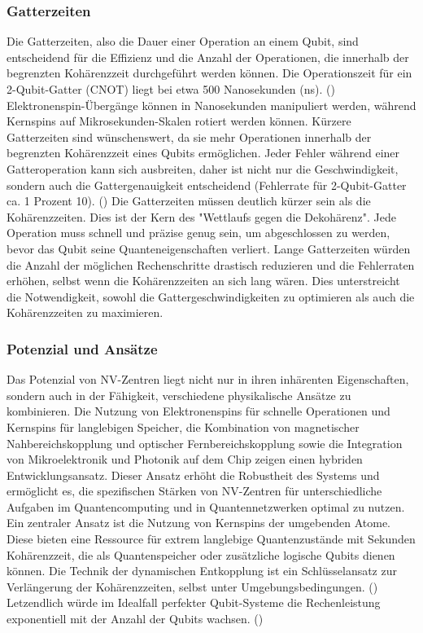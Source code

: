 \subsubsection{Gatterzeiten}
Die Gatterzeiten, also die Dauer einer Operation an einem Qubit, sind entscheidend für die Effizienz und die Anzahl der Operationen, die innerhalb der begrenzten Kohärenzzeit durchgeführt werden können.
Die Operationszeit für ein 2-Qubit-Gatter (CNOT) liegt bei etwa 500 Nanosekunden (ns). (\cite{UngeahnteMoglichkeitenDurch}) Elektronenspin-Übergänge können in Nanosekunden manipuliert werden, während Kernspins auf Mikrosekunden-Skalen rotiert werden können. Kürzere Gatterzeiten sind wünschenswert, da sie mehr Operationen innerhalb der begrenzten Kohärenzzeit eines Qubits ermöglichen. Jeder Fehler während einer Gatteroperation kann sich ausbreiten, daher ist nicht nur die Geschwindigkeit, sondern auch die Gattergenauigkeit entscheidend (Fehlerrate für 2-Qubit-Gatter ca. 1 Prozent 10). (\cite{childressDiamondNVCenters2013})
Die Gatterzeiten müssen deutlich kürzer sein als die Kohärenzzeiten. Dies ist der Kern des "Wettlaufs gegen die Dekohärenz". Jede Operation muss schnell und präzise genug sein, um abgeschlossen zu werden, bevor das Qubit seine Quanteneigenschaften verliert. Lange Gatterzeiten würden die Anzahl der möglichen Rechenschritte drastisch reduzieren und die Fehlerraten erhöhen, selbst wenn die Kohärenzzeiten an sich lang wären. Dies unterstreicht die Notwendigkeit, sowohl die Gattergeschwindigkeiten zu optimieren als auch die Kohärenzzeiten zu maximieren.
\subsubsection{Potenzial und Ansätze}
Das Potenzial von NV-Zentren liegt nicht nur in ihren inhärenten Eigenschaften, sondern auch in der Fähigkeit, verschiedene physikalische Ansätze zu kombinieren. Die Nutzung von Elektronenspins für schnelle Operationen und Kernspins für langlebigen Speicher, die Kombination von magnetischer Nahbereichskopplung und optischer Fernbereichskopplung sowie die Integration von Mikroelektronik und Photonik auf dem Chip zeigen einen hybriden Entwicklungsansatz. Dieser Ansatz erhöht die Robustheit des Systems und ermöglicht es, die spezifischen Stärken von NV-Zentren für unterschiedliche Aufgaben im Quantencomputing und in Quantennetzwerken optimal zu nutzen. 
Ein zentraler Ansatz ist die Nutzung von Kernspins der umgebenden Atome. Diese bieten eine Ressource für extrem langlebige Quantenzustände mit Sekunden Kohärenzzeit, die als Quantenspeicher oder zusätzliche logische Qubits dienen können. Die Technik der dynamischen Entkopplung ist ein Schlüsselansatz zur Verlängerung der Kohärenzzeiten, selbst unter Umgebungsbedingungen. (\cite{childressDiamondNVCenters2013})
Letzendlich würde im Idealfall perfekter Qubit-Systeme die Rechenleistung exponentiell mit der Anzahl der Qubits wachsen. (\cite{UngeahnteMoglichkeitenDurch}) 


